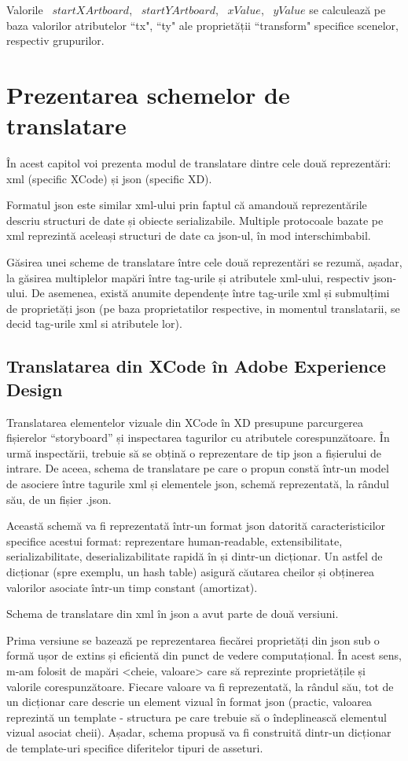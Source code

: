 Valorile ~$startXArtboard$, ~$startYArtboard$, ~$xValue$, ~$yValue$ se calculează pe baza valorilor atributelor ``tx", ``ty" ale proprietății ``transform" specifice scenelor, respectiv grupurilor.

\chapter{Prezentarea schemelor de translatare}

În acest capitol voi prezenta modul de translatare dintre cele două reprezentări: xml (specific XCode) și json (specific XD). 

Formatul json este similar xml-ului prin faptul că amandouă reprezentările descriu structuri de date și obiecte serializabile. Multiple protocoale bazate pe xml reprezintă aceleași structuri de date ca json-ul, în mod interschimbabil.

Găsirea unei scheme de translatare între cele două reprezentări se rezumă, așadar, la găsirea multiplelor mapări între tag-urile și atributele xml-ului, respectiv json-ului. De asemenea, există anumite dependențe între tag-urile xml și submulțimi de proprietăți json (pe baza proprietatilor respective, in momentul translatarii, se decid tag-urile xml si atributele lor).

\section{Translatarea din XCode în Adobe Experience Design}

Translatarea elementelor vizuale din XCode în XD presupune parcurgerea fișierelor “storyboard” și inspectarea tagurilor cu atributele corespunzătoare. În urmă inspectării, trebuie să se obțină o reprezentare de tip json a fișierului de intrare.  De aceea, schema de translatare pe care o propun constă într-un model de asociere între tagurile xml și elementele json, schemă reprezentată, la rândul său, de un fișier .json.  

Această schemă va fi reprezentată într-un format json datorită caracteristicilor specifice acestui format: reprezentare human-readable, extensibilitate, serializabilitate, deserializabilitate rapidă în și dintr-un dicționar. Un astfel de dicționar (spre exemplu, un hash table) asigură căutarea cheilor și obținerea valorilor asociate într-un timp constant (amortizat).

Schema de translatare din xml în json a avut parte de două versiuni. 

Prima versiune se bazează pe reprezentarea fiecărei proprietăți din json sub o formă ușor de extins și eficientă din punct de vedere computațional. În acest sens, m-am folosit de mapări <cheie, valoare> care să reprezinte proprietățile și valorile corespunzătoare. Fiecare valoare va fi reprezentată, la rândul său, tot de un dicționar care descrie un element vizual în format json (practic, valoarea reprezintă un template - structura pe care trebuie să o îndeplinească elementul vizual asociat cheii). Așadar, schema propusă va fi construită dintr-un dicționar de template-uri specifice diferitelor tipuri de asseturi.

